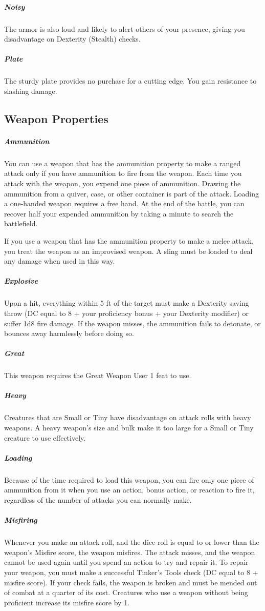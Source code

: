     \subparagraph{Noisy} The armor is also loud and likely to alert others of your presence, giving you disadvantage on Dexterity (Stealth) checks.

    \subparagraph{Plate} The sturdy plate provides no purchase for a cutting edge.
    You gain resistance to slashing damage.

\subsection*{Weapon Properties} \label{ssec::weaponproperties}
    \subparagraph{Ammunition} You can use a weapon that has the ammunition property to make a ranged attack only if you have ammunition to fire from the weapon.
    Each time you attack with the weapon, you expend one piece of ammunition.
    Drawing the ammunition from a quiver, case, or other container is part of the attack.
    Loading a one-handed weapon requires a free hand.
    At the end of the battle, you can recover half your expended ammunition by taking a minute to search the battlefield.

    If you use a weapon that has the ammunition property to make a melee attack, you treat the weapon as an improvised weapon.
    A sling must be loaded to deal any damage when used in this way.

    \subparagraph{Explosive} Upon a hit, everything within 5 ft of the target must make a Dexterity saving throw (DC equal to 8 + your proficiency bonus + your Dexterity modifier) or suffer 1d8 fire damage.
    If the weapon misses, the ammunition fails to detonate, or bounces away harmlessly before doing so.

    \subparagraph{Great} This weapon requires the Great Weapon User 1 feat to use.

    \subparagraph{Heavy} Creatures that are Small or Tiny have disadvantage on attack rolls with heavy weapons.
    A heavy weapon's size and bulk make it too large for a Small or Tiny creature to use effectively.

    \subparagraph{Loading} Because of the time required to load this weapon, you can fire only one piece of ammunition from it when you use an action, bonus action, or reaction to fire it, regardless of the number of attacks you can normally make.

    \subparagraph{Misfiring} Whenever you make an attack roll, and the dice roll is equal to or lower than the weapon’s Misfire score, the weapon misfires.
    The attack misses, and the weapon cannot be used again until you spend an action to try and repair it.
    To repair your weapon, you must make a successful Tinker’s Tools check (DC equal to 8 + misfire score).
    If your check fails, the weapon is broken and must be mended out of combat at a quarter of its cost.
    Creatures who use a weapon without being proficient increase its misfire score by 1.

